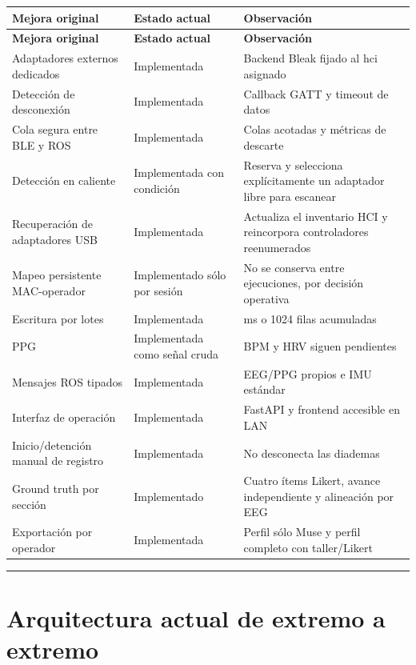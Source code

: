\documentclass[11pt,a4paper]{article}
\begin{document}
\begin{longtable}{@{}>{\raggedright\arraybackslash}p{}>{\raggedright\arraybackslash}p{}>{\raggedright\arraybackslash}p{}@{}}
\toprule
\textbf{Mejora original} & \textbf{Estado actual} & \textbf{Observación} \\
\midrule
\endfirsthead
\toprule
\textbf{Mejora original} & \textbf{Estado actual} & \textbf{Observación} \\
\midrule
\endhead
Adaptadores externos dedicados & Implementada & Backend Bleak fijado al {\ttfamily\small hci} asignado \\
Detección de desconexión & Implementada & Callback GATT y timeout de datos \\
Cola segura entre BLE y ROS & Implementada & Colas acotadas y métricas de descarte \\
Detección en caliente & Implementada con condición & Reserva y selecciona explícitamente un adaptador libre para escanear \\
Recuperación de adaptadores USB & Implementada & Actualiza el inventario HCI y reincorpora controladores reenumerados \\
Mapeo persistente MAC-operador & Implementado sólo por sesión & No se conserva entre ejecuciones, por decisión operativa \\
Escritura por lotes & Implementada & 100 ms o 1024 filas acumuladas \\
PPG & Implementada como señal cruda & BPM y HRV siguen pendientes \\
Mensajes ROS tipados & Implementada & EEG/PPG propios e IMU estándar \\
Interfaz de operación & Implementada & FastAPI y frontend accesible en LAN \\
Inicio/detención manual de registro & Implementada & No desconecta las diademas \\
Ground truth por sección & Implementado & Cuatro ítems Likert, avance independiente y alineación por EEG \\
Exportación por operador & Implementada & Perfil sólo Muse y perfil completo con taller/Likert \\
\bottomrule
\end{longtable}

\medskip\hrule\medskip

\section{Arquitectura actual de extremo a extremo}
\end{document}
